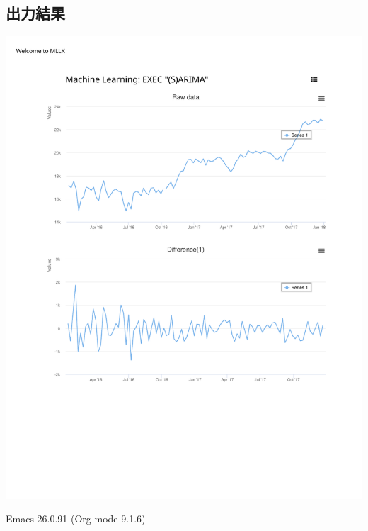 \documentclass[dvipdfmx]{scrartcl}
\begin{document}
\subsection{出力結果}
\label{sec:org79b78ae}
\includegraphics{./result.pdf}

\printbibliography
Emacs 26.0.91 (Org mode 9.1.6)
\end{document}

